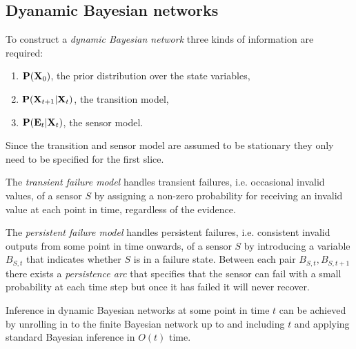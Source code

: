 \documentclass{article}
\begin{document}
\subsection{Dyanamic Bayesian networks}

\begin{definition}[R\&N p. 591]
	To construct a \emph{dynamic Bayesian network} three kinds of information
	are required:
	\begin{enumerate}
		\item $\P(\vec X_0)$, the prior distribution over the state variables,
		\item $\P(\vec X_{t+1}|\vec X_t)$, the transition model,
		\item $\P(\vec E_t | \vec X_t)$, the sensor model.
	\end{enumerate}
	Since the transition and sensor model are assumed to be stationary they only
	need to be specified for the first slice.
\end{definition}

\begin{definition}[R\&N p. 593]
	The \emph{transient failure model} handles transient failures, i.e. occasional invalid
	values, of a sensor $S$ by assigning a non-zero probability for receiving an invalid
	value at each point in time, regardless of the evidence.
\end{definition}

\begin{definition}
	The \emph{persistent failure model} handles persistent failures, i.e. consistent invalid
	outputs from some point in time onwards, of a sensor $S$ by introducing
	a variable $B_{S,t}$ that indicates whether $S$ is in a failure state. Between each pair
	$B_{S,t}, B_{S,t+1}$ there exists a \emph{persistence arc} that specifies that the sensor can
	fail with a small probability at each time step but once  it has failed it will never recover.
\end{definition}

\begin{theorem}[R\&N p. 595]
	Inference in dynamic Bayesian networks at some point in time $t$ can be achieved by unrolling
	in to the finite Bayesian network up to and including $t$ and applying standard Bayesian
	inference in $O(t)$ time.
\end{theorem}
\end{document}
